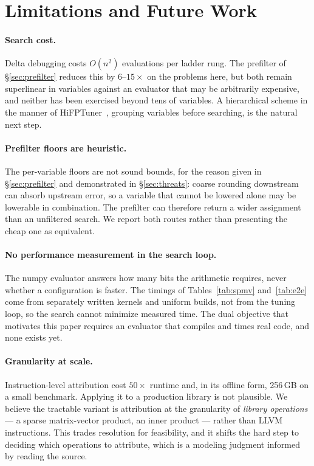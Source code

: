 \documentclass[11pt]{article}
\begin{document}
\section{Limitations and Future Work}
\label{sec:limitations}

\paragraph{Search cost.} Delta debugging costs $O(n^2)$ evaluations per ladder
rung. The prefilter of \S\ref{sec:prefilter} reduces this by $6$--$15\times$ on
the problems here, but both remain superlinear in variables against an evaluator
that may be arbitrarily expensive, and neither has been exercised beyond tens of
variables. A hierarchical scheme in the manner of HiFPTuner~\cite{hifptuner},
grouping variables before searching, is the natural next step.

\paragraph{Prefilter floors are heuristic.} The per-variable floors are not sound
bounds, for the reason given in \S\ref{sec:prefilter} and demonstrated in
\S\ref{sec:threats}: coarse rounding downstream can absorb upstream error, so a
variable that cannot be lowered alone may be lowerable in combination. The
prefilter can therefore return a wider assignment than an unfiltered search. We
report both routes rather than presenting the cheap one as equivalent.

\paragraph{No performance measurement in the search loop.} The numpy evaluator
answers how many bits the arithmetic requires, never whether a configuration is
faster. The timings of Tables~\ref{tab:spmv} and~\ref{tab:e2e} come from
separately written kernels and uniform builds, not from the tuning loop, so the
search cannot minimize measured time. The dual objective that motivates this
paper requires an evaluator that compiles and times real code, and none exists
yet.

\paragraph{Granularity at scale.} Instruction-level attribution cost $50\times$
runtime and, in its offline form, 256\,GB on a small benchmark. Applying it to a
production library is not plausible. We believe the tractable variant is
attribution at the granularity of \emph{library operations} --- a sparse
matrix-vector product, an inner product --- rather than LLVM instructions. This
trades resolution for feasibility, and it shifts the hard step to deciding which
operations to attribute, which is a modeling judgment informed by reading the
source.
\end{document}
